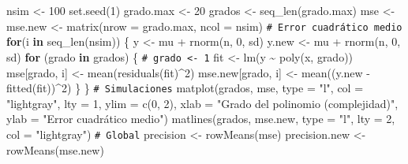 \documentclass[
]{book}
\newenvironment{Shaded}{\begin{snugshade}}{\end{snugshade}}
\newcommand{\AttributeTok}[1]{\textcolor[rgb]{0.77,0.63,0.00}{#1}}
\newcommand{\CommentTok}[1]{\textcolor[rgb]{0.56,0.35,0.01}{\textit{#1}}}
\newcommand{\ControlFlowTok}[1]{\textcolor[rgb]{0.13,0.29,0.53}{\textbf{#1}}}
\newcommand{\DecValTok}[1]{\textcolor[rgb]{0.00,0.00,0.81}{#1}}
\newcommand{\FunctionTok}[1]{\textcolor[rgb]{0.00,0.00,0.00}{#1}}
\newcommand{\NormalTok}[1]{#1}
\newcommand{\OtherTok}[1]{\textcolor[rgb]{0.56,0.35,0.01}{#1}}
\newcommand{\SpecialCharTok}[1]{\textcolor[rgb]{0.00,0.00,0.00}{#1}}
\newcommand{\StringTok}[1]{\textcolor[rgb]{0.31,0.60,0.02}{#1}}
\theoremstyle{break}
\theoremstyle{nonumberplain}
\renewcommand{\CommentTok}[1]{\textcolor[rgb]{0.41,0.41,0.41}{\texttt{#1}}}
\begin{document}
\begin{Shaded}
\begin{Highlighting}[]
\NormalTok{nsim }\OtherTok{\textless{}{-}} \DecValTok{100}
\FunctionTok{set.seed}\NormalTok{(}\DecValTok{1}\NormalTok{)}
\NormalTok{grado.max }\OtherTok{\textless{}{-}} \DecValTok{20}
\NormalTok{grados }\OtherTok{\textless{}{-}} \FunctionTok{seq\_len}\NormalTok{(grado.max) }
\NormalTok{mse }\OtherTok{\textless{}{-}}\NormalTok{ mse.new }\OtherTok{\textless{}{-}} \FunctionTok{matrix}\NormalTok{(}\AttributeTok{nrow =}\NormalTok{ grado.max, }\AttributeTok{ncol =}\NormalTok{ nsim) }\CommentTok{\# Error cuadrático medio}
\ControlFlowTok{for}\NormalTok{(i }\ControlFlowTok{in} \FunctionTok{seq\_len}\NormalTok{(nsim)) \{}
\NormalTok{  y }\OtherTok{\textless{}{-}}\NormalTok{ mu }\SpecialCharTok{+} \FunctionTok{rnorm}\NormalTok{(n, }\DecValTok{0}\NormalTok{, sd)}
\NormalTok{  y.new }\OtherTok{\textless{}{-}}\NormalTok{ mu }\SpecialCharTok{+} \FunctionTok{rnorm}\NormalTok{(n, }\DecValTok{0}\NormalTok{, sd)}
  \ControlFlowTok{for}\NormalTok{ (grado }\ControlFlowTok{in}\NormalTok{ grados) \{ }\CommentTok{\# grado \textless{}{-} 1}
\NormalTok{    fit }\OtherTok{\textless{}{-}} \FunctionTok{lm}\NormalTok{(y }\SpecialCharTok{\textasciitilde{}} \FunctionTok{poly}\NormalTok{(x, grado))}
\NormalTok{    mse[grado, i] }\OtherTok{\textless{}{-}} \FunctionTok{mean}\NormalTok{(}\FunctionTok{residuals}\NormalTok{(fit)}\SpecialCharTok{\^{}}\DecValTok{2}\NormalTok{)}
\NormalTok{    mse.new[grado, i] }\OtherTok{\textless{}{-}} \FunctionTok{mean}\NormalTok{((y.new }\SpecialCharTok{{-}} \FunctionTok{fitted}\NormalTok{(fit))}\SpecialCharTok{\^{}}\DecValTok{2}\NormalTok{)}
\NormalTok{  \}}
\NormalTok{\}}
\CommentTok{\# Simulaciones}
\FunctionTok{matplot}\NormalTok{(grados, mse, }\AttributeTok{type =} \StringTok{"l"}\NormalTok{, }\AttributeTok{col =} \StringTok{"lightgray"}\NormalTok{, }\AttributeTok{lty =} \DecValTok{1}\NormalTok{, }\AttributeTok{ylim =} \FunctionTok{c}\NormalTok{(}\DecValTok{0}\NormalTok{, }\DecValTok{2}\NormalTok{),}
        \AttributeTok{xlab =} \StringTok{"Grado del polinomio (complejidad)"}\NormalTok{,}
        \AttributeTok{ylab =} \StringTok{"Error cuadrático medio"}\NormalTok{)}
\FunctionTok{matlines}\NormalTok{(grados, mse.new, }\AttributeTok{type =} \StringTok{"l"}\NormalTok{, }\AttributeTok{lty =} \DecValTok{2}\NormalTok{, }\AttributeTok{col =} \StringTok{"lightgray"}\NormalTok{) }
\CommentTok{\# Global}
\NormalTok{precision }\OtherTok{\textless{}{-}} \FunctionTok{rowMeans}\NormalTok{(mse)}
\NormalTok{precision.new }\OtherTok{\textless{}{-}} \FunctionTok{rowMeans}\NormalTok{(mse.new)}

\end{Highlighting}
\end{Shaded}
\end{document}
